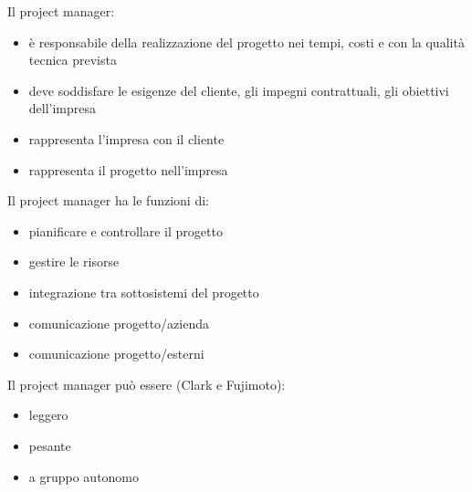 \documentclass[answers, a4paper, 11pt]{exam}
\begin{document}
Il project manager:

\begin{itemize}
    \item è responsabile della realizzazione del progetto nei tempi, costi e con la qualità tecnica prevista
    \item deve soddisfare le esigenze del cliente, gli impegni contrattuali, gli obiettivi dell'impresa
    \item rappresenta l'impresa con il cliente
    \item rappresenta il progetto nell'impresa
\end{itemize}

Il project manager ha le funzioni di:

\begin{itemize}
    \item pianificare e controllare il progetto
    \item gestire le risorse
    \item integrazione tra sottosistemi del progetto
    \item comunicazione progetto/azienda
    \item comunicazione progetto/esterni
\end{itemize}

Il project manager può essere (Clark e Fujimoto):

\begin{itemize}
    \item leggero
    \item pesante
    \item a gruppo autonomo
\end{itemize}
\end{document}
